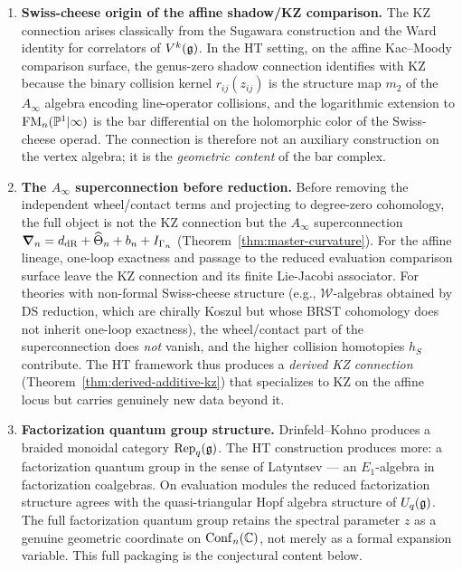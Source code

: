 \begin{enumerate}[label=\textup{(\Roman*)}]
\item \textbf{Swiss-cheese origin of the affine shadow/KZ comparison.}
The KZ connection arises classically from the Sugawara construction and
the Ward identity for correlators of $V^k(\mathfrak{g})$. In the HT setting, on
the affine Kac--Moody comparison surface, the genus-zero shadow
connection identifies with KZ because the binary collision kernel
$r_{ij}(z_{ij})$ is the structure map $m_2$ of the $A_\infty$ algebra
encoding line-operator collisions, and the logarithmic extension to
$\mathrm{FM}_n(\mathbb P^1|\infty)$ is the bar differential on the holomorphic color of
the Swiss-cheese operad. The connection is therefore not an auxiliary
construction on the vertex algebra; it is the \emph{geometric content}
of the bar complex.

\item \textbf{The $A_\infty$ superconnection before reduction.}
Before removing the independent wheel/contact terms and projecting to degree-zero
cohomology, the full object is not the KZ connection but the $A_\infty$
superconnection $\boldsymbol{\nabla}_n = d_{\mathrm{dR}} + \widehat{\Theta}_n + b_n +
I_{\Gamma_n}$ (Theorem~\ref{thm:master-curvature}). For the affine
lineage, one-loop exactness and passage to
the reduced evaluation comparison surface leave the KZ
connection and its finite Lie-Jacobi associator. For theories with non-formal Swiss-cheese structure (e.g., $\mathcal{W}$-algebras
obtained by DS reduction, which are chirally Koszul but whose BRST cohomology does not inherit
one-loop exactness), the wheel/contact part of the superconnection does \emph{not} vanish, and
the higher collision homotopies $h_S$ contribute. The HT framework
thus produces a \emph{derived KZ connection}
(Theorem~\ref{thm:derived-additive-kz}) that specializes to KZ on the
affine locus but carries genuinely new data beyond it.

\item \textbf{Factorization quantum group structure.}
Drinfeld--Kohno produces a braided monoidal category
$\mathrm{Rep}_q(\mathfrak{g})$. The HT construction produces more: a
factorization quantum group in the sense of Latyntsev \cite{Lat23} —
an $E_1$-algebra in factorization coalgebras. On evaluation modules
the reduced factorization structure agrees with the quasi-triangular
Hopf algebra structure of $U_q(\mathfrak{g})$. The full factorization quantum
group retains the spectral parameter $z$ as a genuine geometric
coordinate on $\mathrm{Conf}_n(\mathbb C)$, not merely as a formal expansion
variable. This full packaging is the conjectural content below.


\end{enumerate}
